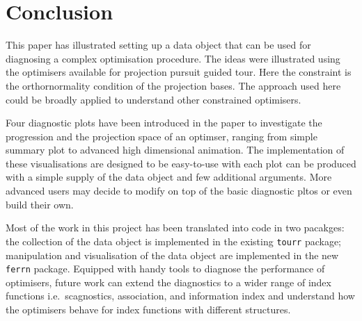 \documentclass[12pt]{article}
\begin{document}
\hypertarget{conclusion}{%
\section{Conclusion}\label{conclusion}}

This paper has illustrated setting up a data object that can be used for diagnosing a complex optimisation procedure. The ideas were illustrated using the optimisers available for projection pursuit guided tour. Here the constraint is the orthornormality condition of the projection bases. The approach used here could be broadly applied to understand other constrained optimisers.

Four diagnostic plots have been introduced in the paper to investigate the progression and the projection space of an optimser, ranging from simple summary plot to advanced high dimensional animation. The implementation of these visualisations are designed to be easy-to-use with each plot can be produced with a simple supply of the data object and few additional arguments. More advanced users may decide to modify on top of the basic diagnostic pltos or even build their own.

Most of the work in this project has been translated into code in two pacakges: the collection of the data object is implemented in the existing \texttt{tourr} package; manipulation and visualisation of the data object are implemented in the new \texttt{ferrn} package. Equipped with handy tools to diagnose the performance of optimisers, future work can extend the diagnostics to a wider range of index functions i.e.~scagnostics, association, and information index \citep{laa2020using} and understand how the optimisers behave for index functions with different structures.

\clearpage



\end{document}
